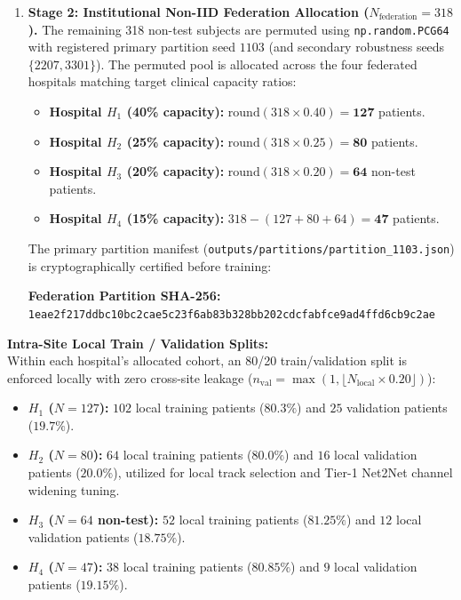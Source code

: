 \documentclass[10pt,a4paper]{article}
\begin{document}
\begin{enumerate}[itemsep=2pt, topsep=2pt]
    \item \textbf{Stage 2: Institutional Non-IID Federation Allocation ($N_{\text{federation}} = 318$).}
    The remaining 318 non-test subjects are permuted using \texttt{np.random.PCG64} with registered primary partition seed $1103$ (and secondary robustness seeds $\{2207, 3301\}$). The permuted pool is allocated across the four federated hospitals matching target clinical capacity ratios:
    \begin{itemize}[itemsep=1pt, topsep=1pt]
        \item \textbf{Hospital $H_1$ (40\% capacity):} $\text{round}(318 \times 0.40) = \mathbf{127}$ patients.
        \item \textbf{Hospital $H_2$ (25\% capacity):} $\text{round}(318 \times 0.25) = \mathbf{80}$ patients.
        \item \textbf{Hospital $H_3$ (20\% capacity):} $\text{round}(318 \times 0.20) = \mathbf{64}$ non-test patients.
        \item \textbf{Hospital $H_4$ (15\% capacity):} $318 - (127 + 80 + 64) = \mathbf{47}$ patients.
    \end{itemize}
    The primary partition manifest (\texttt{outputs/partitions/partition\_1103.json}) is cryptographically certified before training:
    \begin{center}
    \vspace{-4pt}
    \footnotesize \textbf{Federation Partition SHA-256:} \texttt{1eae2f217ddbc10bc2cae5c23f6ab83b328bb202cdcfabfce9ad4ffd6cb9c2ae}
    \vspace{-4pt}
    \end{center}
\end{enumerate}

\noindent \textbf{Intra-Site Local Train / Validation Splits:}\\
Within each hospital's allocated cohort, an 80/20 train/validation split is enforced locally with zero cross-site leakage ($n_{\text{val}} = \max(1, \lfloor N_{\text{local}} \times 0.20 \rfloor)$):
\begin{itemize}[itemsep=1pt, topsep=1pt]
    \item \textbf{$H_1$ ($N=127$):} $102$ local training patients ($80.3\%$) and $25$ validation patients ($19.7\%$).
    \item \textbf{$H_2$ ($N=80$):} $64$ local training patients ($80.0\%$) and $16$ local validation patients ($20.0\%$), utilized for local track selection and Tier-1 Net2Net channel widening tuning.
    \item \textbf{$H_3$ ($N=64$ non-test):} $52$ local training patients ($81.25\%$) and $12$ local validation patients ($18.75\%$).
    \item \textbf{$H_4$ ($N=47$):} $38$ local training patients ($80.85\%$) and $9$ local validation patients ($19.15\%$).
\end{itemize}
\end{document}
